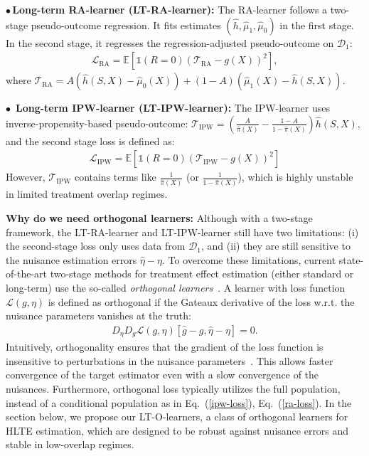 \documentclass{article}
\theoremstyle{plain}
\theoremstyle{definition}
\theoremstyle{remark}
\newcommand{\E}{\mathbb{E}}                %
\newcommand{\1}{\mathds{1}}                %
\newcommand{\methods}{LT-O-learners\xspace}
\newcommand{\LTRA}{LT-RA-learner\xspace}
\newcommand{\LTIPW}{LT-IPW-learner\xspace}
\begin{document}
$\bullet$\,\textbf{Long-term RA-learner (\LTRA):} The RA-learner follows a two-stage pseudo-outcome regression. It fits estimates $(\hat{h}, \hat\mu_1, \hat\mu_0)$ in the first stage. In the second stage, it regresses the regression-adjusted pseudo-outcome on $\mathcal{D}_1$:
\begin{align}
\label{ra-loss}
    \mathcal{L}_{\mathrm{RA}}=\E\left[\1(R=0)(\mathcal{T}_\mathrm{RA} - g(X))^2\right], 
\end{align}
where $\mathcal{T}_\mathrm{RA}= A(\hat{h}(S,X)-\hat\mu_0(X)) + (1-A)(\hat\mu_1(X)-\hat{h}(S,X)).$

$\bullet$ \,\textbf{Long-term IPW-learner (\LTIPW):} The IPW-learner uses inverse-propensity-based pseudo-outcome:
$\mathcal{T}_\mathrm{IPW} = \left(\frac{A}{\hat\pi(X)}-\frac{1-A}{1-\hat\pi(X)}\right) \hat{h}(S,X)$, and the second stage loss is defined as:
\begin{align}
\label{ipw-loss}
    \mathcal{L}_{\mathrm{IPW}}=\E\left[\1(R=0)(\mathcal{T}_\mathrm{IPW} - g(X))^2\right]
\end{align}
However, $\mathcal{T}_\mathrm{IPW}$ contains terms like $\frac{1}{\hat\pi(X)}$ (or $\frac{1}{1-\hat\pi(X)}$), which is highly unstable in limited treatment overlap regimes. 

\textbf{Why do we need orthogonal learners:}
Although with a two-stage framework, the \LTRA and \LTIPW still have two limitations: (i) the second-stage loss only uses data from $\mathcal{D}_1$, and (ii) they are still sensitive to the nuisance estimation errors $\hat\eta-\eta$. To overcome these limitations, current state-of-the-art two-stage methods for treatment effect estimation (either standard or long-term) use the so-called \emph{orthogonal learners}~\cite{Chernozhukov.2018, Foster.2023}. A learner with loss function $\mathcal{L}(g, \eta)$ is defined as orthogonal if the Gateaux derivative of the loss w.r.t. the nuisance parameters vanishes at the truth:
\begin{align}
    D_\eta D_g \mathcal{L}(g, \eta)[\hat{g}-g, \hat\eta - \eta] = 0. 
\end{align}
Intuitively, orthogonality ensures that the gradient of the loss function is insensitive to perturbations in the nuisance parameters~\cite{Chernozhukov.2018}. This allows faster convergence of the target estimator even with a slow convergence of the nuisances. Furthermore, orthogonal loss typically utilizes the full population, instead of a conditional population as in Eq.~(\ref{ipw-loss}), Eq.~(\ref{ra-loss}). In the section below, we propose our \methods, a class of orthogonal learners for HLTE estimation, which are designed to be robust against nuisance errors and stable in low-overlap regimes.
\end{document}
